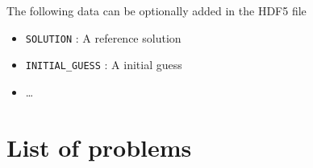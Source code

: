 \documentclass[a4paper,10pt]{article}
\begin{document}
\noindent The following data can be optionally added in the HDF5 file
\begin{itemize}
\item \verb?SOLUTION? : A reference solution
\item \verb?INITIAL_GUESS? : A initial guess
\item \ldots
\end{itemize}



\section{List of problems}
\end{document}

